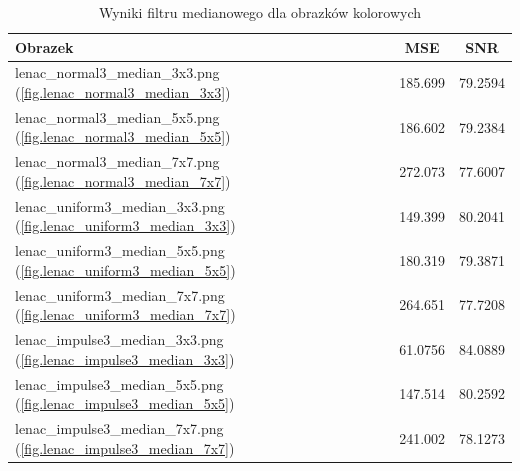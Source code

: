 \documentclass{classrep}
\begin{document}
\begin{table}
  \centering
  \begin{tabular}{|l|c|c|}
    \hline
    \textbf{Obrazek} & \textbf{MSE} & \textbf{SNR} \\
    \hline\hline
    lenac\_normal3\_median\_3x3.png (\ref{fig.lenac_normal3_median_3x3}) & 185.699 & 79.2594 \\ 
    \hline 
    lenac\_normal3\_median\_5x5.png (\ref{fig.lenac_normal3_median_5x5}) & 186.602 & 79.2384 \\ 
    \hline 
    lenac\_normal3\_median\_7x7.png (\ref{fig.lenac_normal3_median_7x7}) & 272.073 & 77.6007 \\ 
    \hline 
    lenac\_uniform3\_median\_3x3.png (\ref{fig.lenac_uniform3_median_3x3}) & 149.399 & 80.2041 \\ 
    \hline 
    lenac\_uniform3\_median\_5x5.png (\ref{fig.lenac_uniform3_median_5x5}) & 180.319 & 79.3871 \\ 
    \hline 
    lenac\_uniform3\_median\_7x7.png (\ref{fig.lenac_uniform3_median_7x7}) & 264.651 & 77.7208 \\ 
    \hline 
    lenac\_impulse3\_median\_3x3.png (\ref{fig.lenac_impulse3_median_3x3}) & 61.0756 & 84.0889 \\ 
    \hline 
    lenac\_impulse3\_median\_5x5.png (\ref{fig.lenac_impulse3_median_5x5}) & 147.514 & 80.2592 \\ 
    \hline 
    lenac\_impulse3\_median\_7x7.png (\ref{fig.lenac_impulse3_median_7x7}) & 241.002 & 78.1273 \\ 
    \hline 
  \end{tabular}
  \caption{Wyniki filtru medianowego dla obrazków kolorowych}
  \label{tab.lenac_median}
\end{table}
\end{document}
